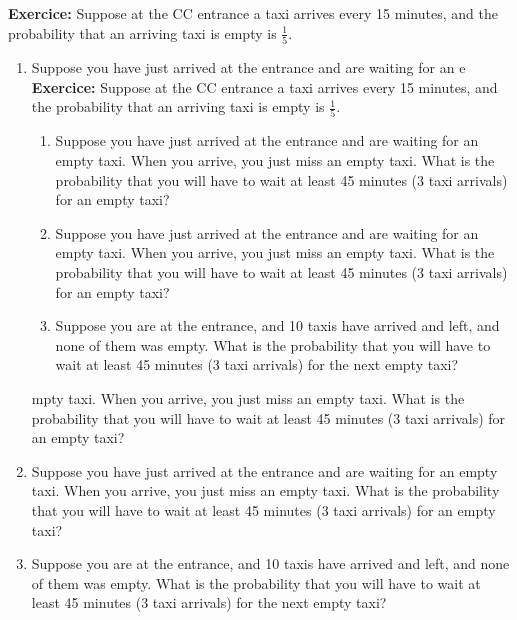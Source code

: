 \documentclass[twocolumn,12pt,a4paper]{article}
\newcounter{num}  %
\begin{document}
	
	\textbf{Exercice:} Suppose at the CC entrance a taxi arrives every 15 minutes, and the
	probability that an arriving taxi is empty is \( \frac{1}{5} \).
	
	\begin{enumerate}
		\item Suppose you have just arrived at the entrance and are waiting for an e
		\textbf{Exercice:} Suppose at the CC entrance a taxi arrives every 15 minutes, and the
		probability that an arriving taxi is empty is \( \frac{1}{5} \).
		
		\begin{enumerate}
			\item Suppose you have just arrived at the entrance and are waiting for an empty taxi. When you arrive, you just miss an empty taxi. 
			What is the probability that you will have to wait at least 45 minutes (3 taxi arrivals) for an empty taxi?
			
			\item Suppose you have just arrived at the entrance and are waiting for an empty taxi. When you arrive, you just miss an empty taxi. 
			What is the probability that you will have to wait at least 45 minutes (3 taxi arrivals) for an empty taxi?
			
			\item Suppose you are at the entrance, and 10 taxis have arrived and left, and
			none of them was empty. What is the probability that you will
			have to wait at least 45 minutes (3 taxi arrivals) for the next empty taxi?
		\end{enumerate}mpty taxi. When you arrive, you just miss an empty taxi. 
		What is the probability that you will have to wait at least 45 minutes (3 taxi arrivals) for an empty taxi?
		
		\item Suppose you have just arrived at the entrance and are waiting for an empty taxi. When you arrive, you just miss an empty taxi. 
		What is the probability that you will have to wait at least 45 minutes (3 taxi arrivals) for an empty taxi?
		
		\item Suppose you are at the entrance, and 10 taxis have arrived and left, and
		none of them was empty. What is the probability that you will
		have to wait at least 45 minutes (3 taxi arrivals) for the next empty taxi?
	\end{enumerate}
\end{document}
